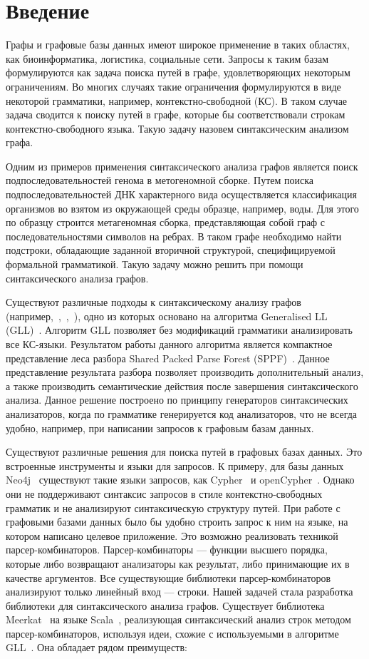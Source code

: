 \section*{Введение}
Графы и графовые базы данных имеют широкое применение в таких областях, как биоинформатика, логистика, социальные сети. Запросы к таким базам формулируются как задача поиска путей в графе, удовлетворяющих некоторым ограничениям. Во многих случаях такие ограничения формулируются в виде некоторой грамматики, например, контекстно-свободной (КС). В таком случае задача сводится к поиску путей в графе, которые бы соответствовали строкам контекстно-свободного языка. Такую задачу назовем синтаксическим анализом графа. 

Одним из примеров применения синтаксического анализа графов является поиск подпоследовательностей генома в метогеномной сборке. Путем поиска подпоследовательностей ДНК характерного вида осуществляется классификация организмов во взятом из окружающей среды образце, например, воды. Для этого по образцу строится метагеномная сборка, представляющая собой граф с последовательностями символов на ребрах. В таком графе необходимо найти подстроки, обладающие заданной вторичной структурой, специфицируемой формальной грамматикой. Такую задачу можно решить при помощи синтаксического анализа графов.

Существуют различные подходы к синтаксическому анализу графов (например,~\cite{GrigRagCFPQuerying},~\cite{Hellings120},~\cite{Sevon}), одно из которых основано на алгоритма Generalised LL (GLL)~\cite{GrigRagCFPQuerying}. Алгоритм GLL позволяет без модификаций грамматики анализировать все КС-языки. Результатом работы данного алгоритма является компактное представление леса разбора Shared Packed Parse Forest (SPPF)~\cite{SPPF}. Данное представление результата разбора позволяет производить дополнительный анализ, а также производить семантические действия после завершения синтаксического анализа. Данное решение построено по принципу генераторов синтаксических анализаторов, когда по грамматике генерируется код анализаторов, что не всегда удобно, например, при написании запросов к графовым базам данных.

Существуют различные решения для поиска путей в графовых базах данных. Это встроенные инструменты и языки для запросов. К примеру, для базы данных Neo4j~\cite{Neo4j} существуют такие языки запросов, как Cypher~\cite{Cypher} и openCypher~\cite{openCypher}. Однако они не поддерживают синтаксис запросов в стиле контекстно-свободных грамматик и не анализируют синтаксическую структуру путей. При работе с графовыми базами данных было бы удобно строить запрос к ним на языке, на котором написано целевое приложение. Это возможно реализовать техникой парсер-комбинаторов. Парсер-комбинаторы --- функции высшего порядка, которые либо возвращают анализаторы как результат, либо принимающие их в качестве аргументов. Все существующие библиотеки парсер-комбинаторов анализируют только линейный вход --- строки. Нашей задачей стала разработка библиотеки для синтаксического анализа графов. Существует библиотека Meerkat~\cite{Meerkat} на языке Scala~\cite{Scala}, реализующая синтаксический анализ строк методом парсер-комбинаторов, используя идеи, схожие с используемыми в алгоритме GLL~\cite{GLL}. Она обладает рядом преимуществ:


